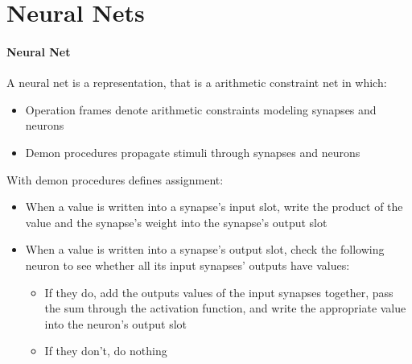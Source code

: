 \documentclass{article}
\begin{document}
\section{Neural Nets}

\paragraph{Neural Net} A neural net is a representation, that is a
arithmetic constraint net in which:
\begin{itemize}
  \item Operation frames denote arithmetic constraints modeling
    synapses and neurons
  \item Demon procedures propagate stimuli through synapses and
    neurons
\end{itemize}
With demon procedures defines assignment:
\begin{itemize}
  \item When a value is written into a synapse's input slot, write
    the product of the value and the synapse's weight into the
    synapse's output slot
  \item When a value is written into a synapse's output slot,
    check the following neuron to see whether all its input
    synapses' outputs have values:
    \begin{itemize}
      \item If they do, add the outputs values of the input
        synapses together, pass the sum through the activation
        function, and write the appropriate value into the
        neuron's output slot
      \item If they don't, do nothing
    \end{itemize}
\end{itemize}
\end{document}
